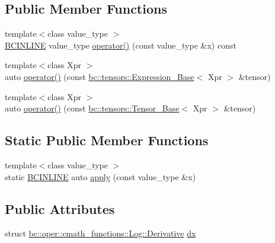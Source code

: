 \subsection*{Public Member Functions}
\begin{DoxyCompactItemize}
\item 
{\footnotesize template$<$class value\+\_\+type $>$ }\\\hyperlink{common_8h_a6699e8b0449da5c0fafb878e59c1d4b1}{B\+C\+I\+N\+L\+I\+NE} value\+\_\+type \hyperlink{structbc_1_1oper_1_1cmath__functions_1_1Log_a68d70e7d6eb87fc8fa8e273ff8fdbe07}{operator()} (const value\+\_\+type \&x) const
\item 
{\footnotesize template$<$class Xpr $>$ }\\auto \hyperlink{structbc_1_1oper_1_1cmath__functions_1_1Log_a334a8c690074302aec8657fd3ce08a65}{operator()} (const \hyperlink{classbc_1_1tensors_1_1Expression__Base}{bc\+::tensors\+::\+Expression\+\_\+\+Base}$<$ Xpr $>$ \&tensor)
\item 
{\footnotesize template$<$class Xpr $>$ }\\auto \hyperlink{structbc_1_1oper_1_1cmath__functions_1_1Log_a19ab7083250b6f333610756453b81005}{operator()} (const \hyperlink{classbc_1_1tensors_1_1Tensor__Base}{bc\+::tensors\+::\+Tensor\+\_\+\+Base}$<$ Xpr $>$ \&tensor)
\end{DoxyCompactItemize}
\subsection*{Static Public Member Functions}
\begin{DoxyCompactItemize}
\item 
{\footnotesize template$<$class value\+\_\+type $>$ }\\static \hyperlink{common_8h_a6699e8b0449da5c0fafb878e59c1d4b1}{B\+C\+I\+N\+L\+I\+NE} auto \hyperlink{structbc_1_1oper_1_1cmath__functions_1_1Log_a46e99b2cd4130fad15fe14c5e974f94d}{apply} (const value\+\_\+type \&x)
\end{DoxyCompactItemize}
\subsection*{Public Attributes}
\begin{DoxyCompactItemize}
\item 
struct \hyperlink{structbc_1_1oper_1_1cmath__functions_1_1Log_1_1Derivative}{bc\+::oper\+::cmath\+\_\+functions\+::\+Log\+::\+Derivative} \hyperlink{structbc_1_1oper_1_1cmath__functions_1_1Log_aa46b349732849baddfc44006ecbbec27}{dx}
\end{DoxyCompactItemize}


